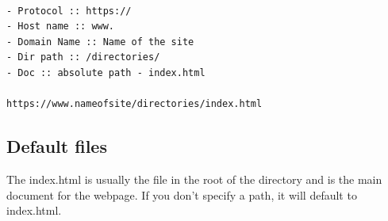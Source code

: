 \documentclass[11pt]{article}
\begin{document}
\begin{verbatim}

- Protocol :: https://
- Host name :: www.
- Domain Name :: Name of the site
- Dir path :: /directories/
- Doc :: absolute path - index.html

https://www.nameofsite/directories/index.html

\end{verbatim}
\subsection{Default files}
\label{sec:orga6b3ec5}

The index.html is usually the file in the root of the directory and is the main document for the webpage. If you don't specify a path, it will default to index.html.
\end{document}
